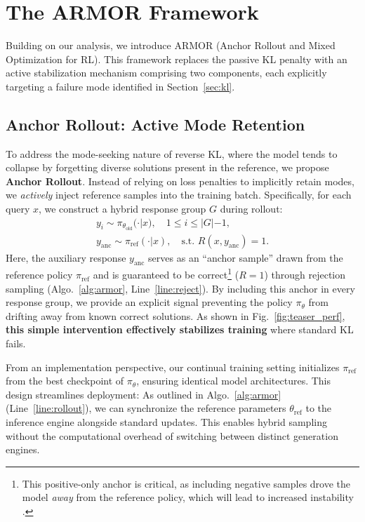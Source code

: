 \section{The ARMOR Framework}

Building on our analysis, we introduce ARMOR (Anchor Rollout and Mixed Optimization for RL). 
This framework replaces the passive KL penalty with an active stabilization mechanism comprising two components, each explicitly targeting a failure mode identified in Section~\ref{sec:kl}.

\subsection{Anchor Rollout: Active Mode Retention}
To address the mode-seeking nature of reverse KL, where the model tends to collapse by forgetting diverse solutions present in the reference, we propose \textbf{Anchor Rollout}.
Instead of relying on loss penalties to implicitly retain modes, we \emph{actively} inject reference samples into the training batch.
Specifically, for each query $x$, we construct a hybrid response group $G$ during rollout:
\begin{equation}
\begin{gathered}
y_i \sim \pi_{\theta_{\text{old}}} (\cdot|x), \quad 1 \le i \le |G|-1,\\
y_\text{anc} \sim \pi_{\text{ref}}(\cdot | x), \quad \text{s.t. } R(x, y_\text{anc}) = 1.
\end{gathered}
\end{equation}
Here, the auxiliary response $y_\text{anc}$ serves as an ``anchor sample'' drawn from the reference policy $\pi_{\text{ref}}$ and is guaranteed to be correct\footnote{This positive-only anchor is critical, as including negative samples drove the model \textit{away} from the reference policy, which will lead to increased instability \citep{Deepseek-V3.2}.} ($R=1$) through rejection sampling (Algo.~\ref{alg:armor}, Line~\ref{line:reject}).
By including this anchor in every response group, we provide an explicit signal preventing the policy $\pi_\theta$ from drifting away from known correct solutions. 
As shown in Fig.~\ref{fig:teaser_perf}, \textbf{this simple intervention effectively stabilizes training} where standard KL fails.

From an implementation perspective, our continual training setting initializes $\pi_\mathrm{ref}$ from the best checkpoint of $\pi_\theta$, ensuring identical model architectures.
This design streamlines deployment:
As outlined in Algo.~\ref{alg:armor} (Line~\ref{line:rollout}), we can synchronize the reference parameters $\theta_\text{ref}$ to the inference engine alongside standard updates.
This enables hybrid sampling without the computational overhead of switching between distinct generation engines.

